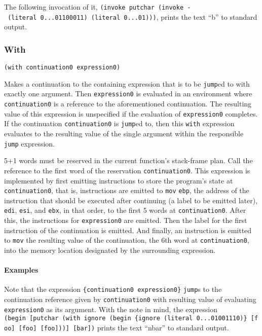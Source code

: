 \documentclass[]{article}
\let\oldparagraph\paragraph
\renewcommand{\paragraph}[1]{\oldparagraph{#1}\mbox{}}
\begin{document}
The following invocation of it,
\texttt{(invoke\ putchar\ (invoke\ -\ (literal\ 0...01100011)\ (literal\ 0...01)))},
prints the text ``b'' to standard output.

\hypertarget{with}{\subsubsection{With}\label{with}}

\begin{verbatim}
(with continuation0 expression0)
\end{verbatim}

Makes a continuation to the containing expression that is to be
\texttt{jump}ed to with exactly one argument. Then \texttt{expression0}
is evaluated in an environment where \texttt{continuation0} is a
reference to the aforementioned continuation. The resulting value of
this expression is unspecified if the evaluation of \texttt{expression0}
completes. If the continuation \texttt{continuation0} is \texttt{jump}ed
to, then this \texttt{with} expression evaluates to the resulting value
of the single argument within the responsible \texttt{jump} expression.

5+1 words must be reserved in the current function's stack-frame plan.
Call the reference to the first word of the reservation
\texttt{continuation0}. This expression is implemented by first emitting
instructions to store the program's state at \texttt{continuation0},
that is, instructions are emitted to \texttt{mov} \texttt{ebp}, the
address of the instruction that should be executed after continuing (a
label to be emitted later), \texttt{edi}, \texttt{esi}, and
\texttt{ebx}, in that order, to the first 5 words at
\texttt{continuation0}. After this, the instructions for
\texttt{expression0} are emitted. Then the label for the first
instruction of the continuation is emitted. And finally, an instruction
is emitted to \texttt{mov} the resulting value of the continuation, the
6th word at \texttt{continuation0}, into the memory location designated
by the surrounding expression.

\paragraph{Examples}\label{examples}

Note that the expression \texttt{\{continuation0\ expression0\}}
\texttt{jump}s to the continuation reference given by
\texttt{continuation0} with resulting value of evaluating
\texttt{expression0} as its argument. With the note in mind, the
expression
\texttt{(begin\ {[}putchar\ (with\ ignore\ (begin\ \{ignore\ (literal\ 0...01001110)\}\ {[}foo{]}\ {[}foo{]}\ {[}foo{]})){]}\ {[}bar{]})}
prints the text ``nbar'' to standard output.
\end{document}
